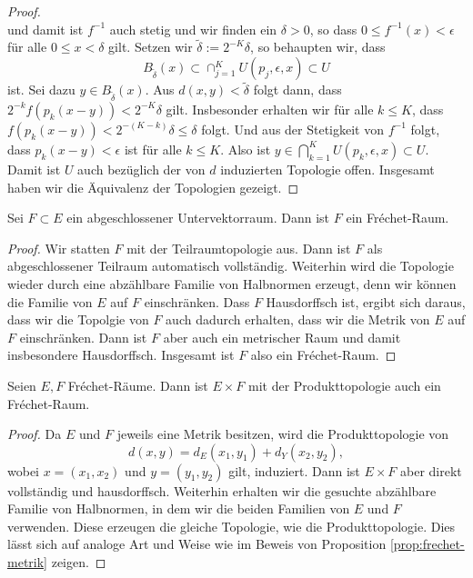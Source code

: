 \begin{proof}
\[  \]
  und damit ist $f^{-1}$ auch stetig und wir finden ein $\delta > 0$,
  so dass $0 \leq f^{-1}(x) < \epsilon$ für alle $0 \leq x <
  \delta$ gilt. Setzen wir $\tilde \delta := 2^{-K} \delta$, so behaupten
  wir, dass
  \[
  B_{\tilde \delta}(x) \subset \cap_{j=1}^K U(p_j,
  \epsilon, x) \subset U
  \]
  ist. Sei dazu $y \in B_{\tilde
      \delta}(x)$. Aus $d(x,y) < \tilde \delta$ folgt dann, dass
    $2^{-k} f(p_k(x-y)) < 2^{-K} \delta$ gilt. Insbesonder erhalten
    wir für alle $k \leq K$, dass $f(p_k(x-y)) < 2^{-(K-k)} \delta
    \leq \delta$ folgt. Und aus der Stetigkeit von $f^{-1}$ folgt, dass
    $p_k(x-y) < \epsilon$ ist für alle $k \leq K$. Also ist $y \in
    \bigcap_{k=1}^K U(p_k, \epsilon, x) \subset U$. Damit ist $U$ auch
    bezüglich der von $d$ induzierten Topologie offen. Insgesamt haben
    wir die Äquivalenz der Topologien gezeigt.
\end{proof}
  
\begin{thm}
  \label{thm:frechet-abgeschlossen}
  Sei $F \subset E$ ein abgeschlossener Untervektorraum. Dann ist $F$
  ein Fr\'echet-Raum.
\end{thm}

\begin{proof}
  Wir statten $F$ mit der Teilraumtopologie aus. Dann ist $F$
  als abgeschlossener Teilraum automatisch vollständig. Weiterhin wird
  die Topologie wieder durch eine abzählbare Familie von Halbnormen
  erzeugt, denn wir können die Familie von $E$ auf $F$
  einschränken. Dass $F$ Hausdorffsch ist, ergibt sich daraus, dass
  wir die Topolgie von $F$ auch dadurch erhalten, dass wir die Metrik
  von $E$ auf $F$ einschränken. Dann ist $F$ aber auch ein metrischer
  Raum und damit insbesondere Hausdorffsch. Insgesamt ist $F$ also ein
  Fr\'echet-Raum.
\end{proof}

\begin{thm}
  \label{thm:frechet-summe}
  Seien $E, F$ Fr\'echet-Räume. Dann ist $E \times F$ mit der
  Produkttopologie auch ein Fr\'echet-Raum.
\end{thm}

\begin{proof}
  Da $E$ und $F$ jeweils eine Metrik besitzen, wird die
  Produkttopologie von
  \[
  d(x,y) = d_E(x_1, y_1) + d_Y(x_2, y_2),
  \]
  wobei
  $x = (x_1,x_2)$ und $y = (y_1, y_2)$ gilt, induziert. Dann ist $E
  \times F$ aber direkt vollständig und hausdorffsch. Weiterhin
  erhalten wir die gesuchte abzählbare Familie von Halbnormen, in dem
  wir die beiden Familien von $E$ und $F$ verwenden. Diese erzeugen
  die gleiche Topologie, wie die Produkttopologie. Dies lässt sich auf
  analoge Art und Weise wie im Beweis von Proposition
  \ref{prop:frechet-metrik} zeigen.
\end{proof}

